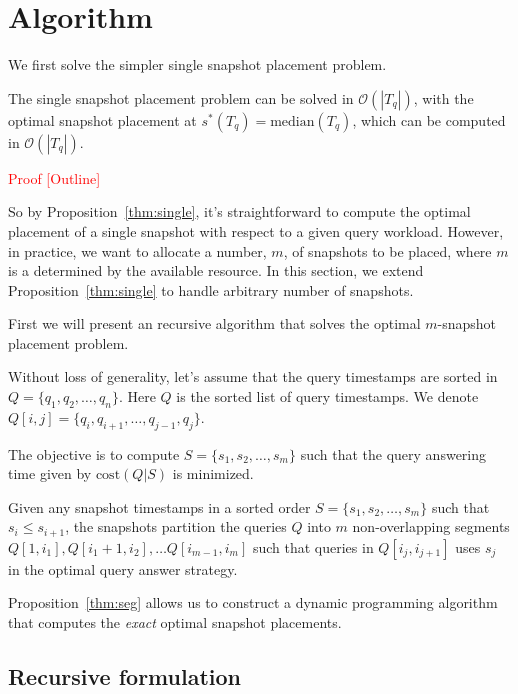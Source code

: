 \section{Algorithm}

We first solve the simpler single snapshot placement problem.

\begin{prop}
    \label{thm:single}
    The single snapshot placement problem can be solved in $\mathcal{O}(|T_q|)$,
    with the optimal snapshot placement at
    $ s^*(T_q) = \mathrm{median}(T_q) $,
    which can be computed in $\mathcal{O}(|T_q|)$.
\end{prop}

\textcolor{red}{Proof [Outline]}

So by Proposition~\ref{thm:single}, it's straightforward to compute the optimal
placement of a single snapshot with respect to a given query workload.  However,
in practice, we want to allocate a number, $m$, of snapshots to be placed, where
$m$ is a determined by the available resource.
In this section, we extend Proposition~\ref{thm:single} to handle arbitrary number
of snapshots.

First we will present an recursive algorithm that solves the optimal
$m$-snapshot placement problem.

Without loss of generality, let's assume that  the query timestamps are sorted
in $Q = \{q_1, q_2, \dots, q_n\}$.  Here $Q$ is the sorted list of query
timestamps.  We denote $Q[i,j] = \{q_i, q_{i+1}, \dots, q_{j-1}, q_j\}$.

The objective is to compute $S = \{s_1, s_2, \dots, s_m\}$ such
that the query answering time given by $\mathrm{cost}(Q|S)$ is minimized.

\begin{prop}
    \label{thm:seg}
    Given any snapshot timestamps in a sorted order $S = \{s_1, s_2, \dots,
    s_m\}$ such that $s_i\leq s_{i+1}$, the snapshots partition the queries $Q$
    into $m$ non-overlapping segments $Q[1, i_1], Q[i_1+1, i_2], \dots
    Q[i_{m-1}, i_m]$ such that queries in $Q[i_j, i_{j+1}]$ uses $s_j$
    in the optimal query answer strategy.
\end{prop}

Proposition~\ref{thm:seg} allows us to construct a dynamic programming algorithm
that computes the {\em exact} optimal snapshot placements.

\subsection{Recursive formulation}

